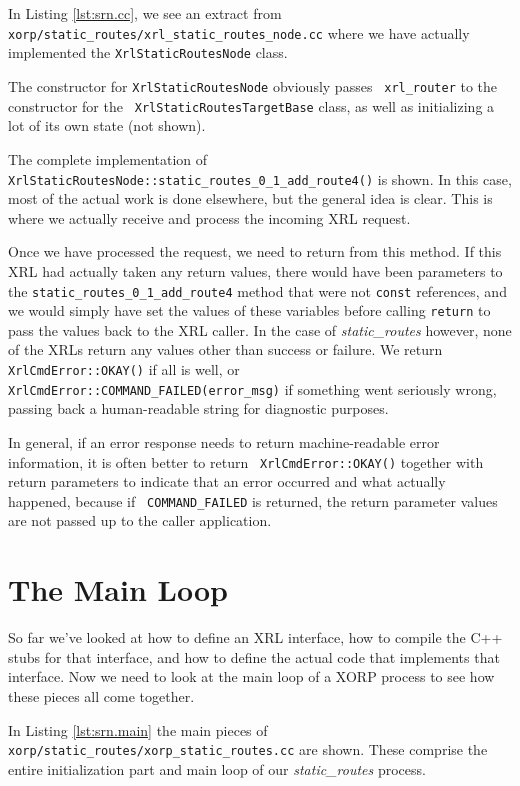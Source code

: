 \documentclass[11pt]{article}
\newcommand{\stt}{\tt\small}
\newcommand{\SRI}{{\it static\_routes}\xspace}
\begin{document}
In Listing \ref{lst:srn.cc}, we see an extract from {\stt
xorp/static\_routes/xrl\_static\_routes\_node.cc} where we have
actually implemented the {\stt XrlStaticRoutesNode} class.  

The constructor for {\stt XrlStaticRoutesNode} obviously passes {\stt
xrl\_router} to the constructor for the {\stt
XrlStaticRoutesTargetBase} class, as well as initializing a lot of
its own state (not shown).

The complete implementation of {\stt
XrlStaticRoutesNode::static\_routes\_0\_1\_add\_route4()} is shown.  In
this case, most of the actual work is done elsewhere, but the general
idea is clear.  This is where we actually receive and process the
incoming XRL request.  

Once we have processed the request, we need to return from this
method.  If this XRL had actually taken any return values, there would
have been parameters to the {\stt static\_routes\_0\_1\_add\_route4}
method that were not {\stt const} references, and we would simply have
set the values of these variables before calling {\stt return} to pass
the values back to the XRL caller.  In the case of \SRI however, none
of the XRLs return any values other than success or failure.  We
return {\stt XrlCmdError::OKAY()} if all is well, or {\stt
XrlCmdError::COMMAND\_FAILED(error\_msg)} if something went seriously
wrong, passing back a human-readable string for diagnostic purposes.

In general, if an error response needs to return machine-readable
error information, it is often better to return {\stt
XrlCmdError::OKAY()} together with return parameters to indicate that
an error occurred and what actually happened, because if {\stt
COMMAND\_FAILED} is returned, the return parameter values are not
passed up to the caller application.

\newpage
\section{The Main Loop}
\label{main}

So far we've looked at how to define an XRL interface, how to compile
the C++ stubs for that interface, and how to define the actual
code that implements that interface.  Now we need to look at the main
loop of a XORP process to see how these pieces all come together.

In Listing \ref{lst:srn.main} the main pieces of {\stt
xorp/static\_routes/xorp\_static\_routes.cc} are shown.  These
comprise the entire initialization part and main loop of our \SRI
process.
\end{document}
